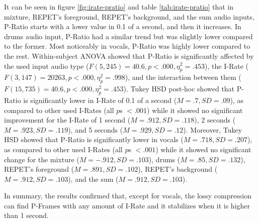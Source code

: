 It can be seen in figure \ref{fig:irate-pratio} and table \ref{tab:irate-pratio} that in mixture, REPET's foreground, REPET's background, and the sum audio inputs, P-Ratio starts with a lower value in 0.1 of a second, and then it increases.
In drums audio input, P-Ratio had a similar trend but was slightly lower compared to the former.
Most noticeably in vocals, P-Ratio was highly lower compared to the rest.
Within-subject ANOVA showed that P-Ratio is significantly affected by the used input audio type ($F(5,245)=40.6, p<.000, \eta_{p}^{2}=.453$), the I-Rate ($F(3,147)=20263, p<.000, \eta_{p}^{2}=.998$), and the interaction between them ($F(15,735)=40.6, p<.000, \eta_{p}^{2}=.453$).
Tukey HSD post-hoc showed that P-Ratio is significantly lower in I-Rate of 0.1 of a second ($M=.7, SD=.09$), as compared to other used I-Rates (all $p$s $<.001$) while it showed no significant improvement for the I-Rate of 1 second ($M=.912, SD=.118$), 2 seconds ($M=.923, SD=.119$), and 5 seconds ($M=.929, SD=.12$). Moreover, Tukey HSD showed that P-Ratio is significantly lower in vocals ($M=.718, SD=.207$), as compared to other used I-Rates (all $p$s $<.001$) while it showed no significant change for the mixture ($M=-.912, SD=.103$), drums ($M=.85, SD=.132$), REPET's foreground ($M=.891, SD=.102$), REPET's background ($M=.912, SD=.103$), and the sum ($M=.912, SD=.103$).

In summary, the results confirmed that, except for vocals, the lossy compression can find P-Frames with any amount of I-Rate and it stabilizes when it is higher than 1 second.


%   

